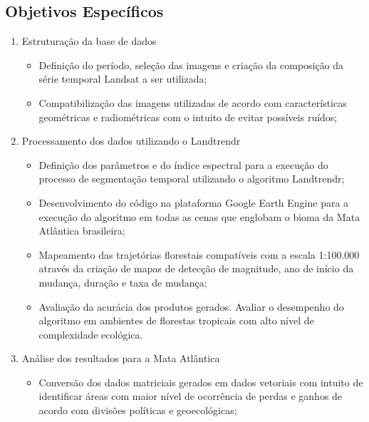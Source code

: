 \subsection*{Objetivos Específicos}
\begin{enumerate}

    \item Estruturação da base de dados
    
    \begin{itemize}
        \item Definição do período, seleção das imagens e criação da composição da série temporal Landsat a ser utilizada;
        
        \item Compatibilização das imagens utilizadas de acordo com características geométricas e radiométricas com o intuito de evitar possíveis ruídos;
    \end{itemize}
    
    \item Processamento dos dados utilizando o Landtrendr
    
    \begin{itemize}
        \item Definição dos parâmetros e do índice espectral para a execução do processo de segmentação temporal utilizando o algoritmo Landtrendr;
        
        \item Desenvolvimento do código na plataforma Google Earth Engine para a execução do algoritmo em todas as cenas que englobam o bioma da Mata Atlântica brasileira;
        
        \item Mapeamento das trajetórias florestais compatíveis com a escala 1:100.000 através da criação de mapas de detecção de magnitude, ano de início da mudança, duração e taxa de mudança;
        
        \item Avaliação da acurácia dos produtos gerados. Avaliar o desempenho do algoritmo em ambientes de florestas tropicais com alto nível de complexidade ecológica.
    \end{itemize}
    
    \item Análise dos resultados para a Mata Atlântica

    \begin{itemize}
        \item Conversão dos dados matriciais gerados em dados vetoriais com intuito de identificar áreas com maior nível de ocorrência de perdas e ganhos de acordo com divisões políticas e geoecológicas;
    \end{itemize}

\end{enumerate}